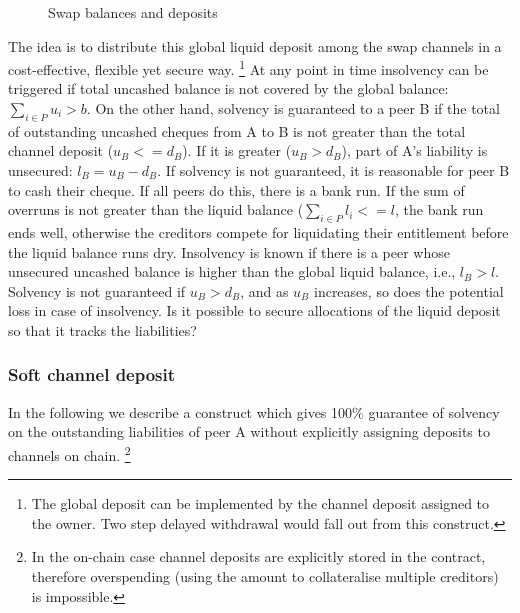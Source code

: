 \begin{center}
\begin{figure}
\begin{center}
\begin{tikzpicture}
\end{tikzpicture}
\end{center}
\caption{Swap balances and deposits}
\label{fig:softchanneldeposit}
\end{figure}
\end{center}


The idea is to distribute this global liquid deposit among the swap channels in a cost-effective, flexible yet secure way.%
%
\footnote{The global deposit can be implemented by the channel deposit assigned to the owner. Two step delayed withdrawal would fall out from this construct.}
%
At any point in time insolvency can be triggered if total uncashed balance is not covered by the global balance: $\sum_{i\in P}u_i > b$. On the other hand, solvency is guaranteed to a peer B if the total of outstanding uncashed cheques from A to B is not greater than the total channel deposit ($u_B <= d_B$). If it is greater ($u_B > d_B$), part of A's liability is unsecured: $l_B = u_B - d_B$. If solvency is not guaranteed, it is reasonable for peer B to cash their cheque. If all peers do this, there is a bank run. If the sum of overruns is not greater than the liquid balance ($\sum_{i\in P}l_i <= l$, the bank run ends well, otherwise the creditors compete for 
liquidating their entitlement before the liquid balance runs dry.
Insolvency is known if there is a peer whose unsecured uncashed balance is higher than the global liquid balance, i.e., $l_B > l$.
Solvency is not guaranteed if $u_B > d_B$, and as $u_B$ increases, so does the potential loss in case of insolvency. Is it possible to secure allocations of the liquid deposit so that it tracks the liabilities? 

\subsubsection{Soft channel deposit}

In the following we describe a construct which gives 100$\%$ guarantee of solvency on the outstanding liabilities of peer A without explicitly assigning deposits to channels on chain.%
%
\footnote{In the on-chain case channel deposits are explicitly stored in the contract, therefore overspending
(using the amount to collateralise multiple creditors) is impossible.}

